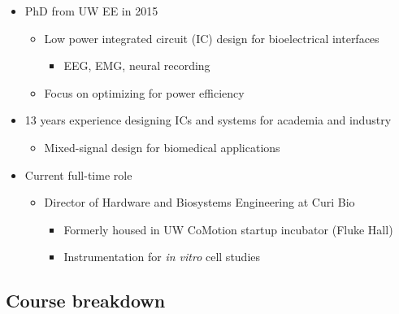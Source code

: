 \documentclass[11pt]{article}
\providecommand{\tightlist}{%
      \setlength{\itemsep}{0pt}\setlength{\parskip}{0pt}}
\begin{document}
    \begin{itemize}
\tightlist
\item
  PhD from UW EE in 2015

  \begin{itemize}
  \tightlist
  \item
    Low power integrated circuit (IC) design for bioelectrical
    interfaces

    \begin{itemize}
    \tightlist
    \item
      EEG, EMG, neural recording
    \end{itemize}
  \item
    Focus on optimizing for power efficiency
  \end{itemize}
\item
  13 years experience designing ICs and systems for academia and
  industry

  \begin{itemize}
  \tightlist
  \item
    Mixed-signal design for biomedical applications
  \end{itemize}
\item
  Current full-time role

  \begin{itemize}
  \tightlist
  \item
    Director of Hardware and Biosystems Engineering at Curi Bio

    \begin{itemize}
    \tightlist
    \item
      Formerly housed in UW CoMotion startup incubator (Fluke Hall)
    \item
      Instrumentation for \emph{in vitro} cell studies
    \end{itemize}
  \end{itemize}
\end{itemize}

    \hypertarget{course-breakdown}{%
\subsection{Course breakdown}\label{course-breakdown}}
\end{document}
